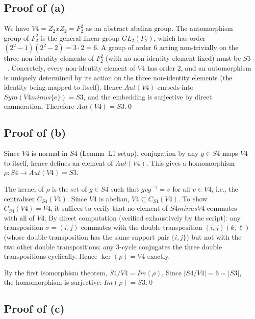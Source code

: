 \documentclass[11pt,a4paper]{article}
\def\Sfour{S4}%
\def\Vfour{V4}%
\def\Sthree{S3}%
\def\cong{=}%
\def\times{x}%
\def\setminus{ minus }%
\def\Aut{Aut}%
\def\Sym{Sym}%
\def\GL{GL}%
\def\ZZ{Z}%
\def\FF{F}%
\def\mathbb#1{#1}%
\def\mathrm#1{#1}%
\theoremstyle{plain}
\theoremstyle{definition}
\theoremstyle{remark}
\newcommand{\Sfour}{S_4}
\newcommand{\Vfour}{V_4}
\newcommand{\Sthree}{S_3}
\newcommand{\Aut}{\mathrm{Aut}}
\newcommand{\Sym}{\mathrm{Sym}}
\newcommand{\GL}{\mathrm{GL}}
\newcommand{\FF}{\mathbb{F}}
\newcommand{\ZZ}{\mathbb{Z}}
\begin{document}
\subsection{Proof of (a)}

We have $\Vfour \cong \ZZ_2 \times \ZZ_2 = \FF_2^2$ as an abstract abelian group. The automorphism group of $\FF_2^2$ is the general linear group $\GL_2(\FF_2)$, which has order $(2^2-1)(2^2-2) = 3 \cdot 2 = 6$. A group of order 6 acting non-trivially on the three non-identity elements of $\FF_2^2$ (with no non-identity element fixed) must be $\Sthree$~\cite{Rotman_Groups}. Concretely, every non-identity element of $\Vfour$ has order 2, and an automorphism is uniquely determined by its action on the three non-identity elements (the identity being mapped to itself). Hence $\Aut(\Vfour)$ embeds into $\Sym(\Vfour \setminus \{e\}) \cong \Sthree$, and the embedding is surjective by direct enumeration. Therefore $\Aut(\Vfour) \cong \Sthree$.\qed

\subsection{Proof of (b)}

Since $\Vfour$ is normal in $\Sfour$ (Lemma~L1 setup), conjugation by any $g \in \Sfour$ maps $\Vfour$ to itself, hence defines an element of $\Aut(\Vfour)$. This gives a homomorphism $\rho \colon \Sfour \to \Aut(\Vfour) \cong \Sthree$.

The kernel of $\rho$ is the set of $g \in \Sfour$ such that $g v g^{-1} = v$ for all $v \in \Vfour$, i.e., the centraliser $C_{\Sfour}(\Vfour)$. Since $\Vfour$ is abelian, $\Vfour \subseteq C_{\Sfour}(\Vfour)$. To show $C_{\Sfour}(\Vfour) = \Vfour$, it suffices to verify that no element of $\Sfour \setminus \Vfour$ commutes with all of $\Vfour$. By direct computation (verified exhaustively by the script): any transposition $\sigma = (i,j)$ commutes with the double transposition $(i,j)(k,\ell)$ (whose double transposition has the same support pair $\{i,j\}$) but not with the two other double transpositions; any $3$-cycle conjugates the three double transpositions cyclically. Hence $\ker(\rho) = \Vfour$ exactly.

By the first isomorphism theorem, $\Sfour/\Vfour \cong \mathrm{Im}(\rho)$. Since $|\Sfour/\Vfour| = 6 = |\Sthree|$, the homomorphism is surjective: $\mathrm{Im}(\rho) = \Sthree$.\qed

\subsection{Proof of (c)}
\end{document}
